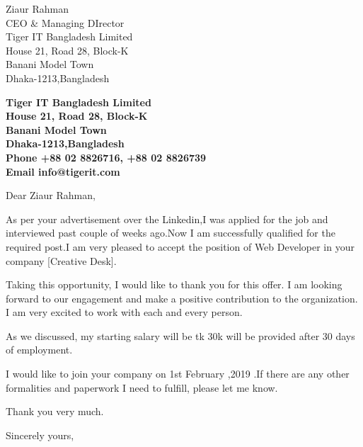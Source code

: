 \documentclass[12pt]{letter}
\begin{document}
\begin{letter}
	{Ziaur Rahman\\
	CEO \& Managing DIrector\\
	Tiger IT Bangladesh Limited\\
	House 21, Road 28, Block-K\\ 
	Banani Model Town\\
	Dhaka-1213,Bangladesh} 
\begin{center}
\large{\bf Tiger IT Bangladesh Limited\\}
\small{\textbf {House 21, Road 28, Block-K\\ 
		Banani Model Town\\
		Dhaka-1213,Bangladesh\\
		Phone +88 02 8826716, +88 02 8826739\\
		Email info@tigerit.com}}
\end{center} 	
						
\signature{.......................................\\(Kanis Fatema)}
		
\opening{Dear Ziaur Rahman,} 
As per your advertisement over the Linkedin,I was applied for the job and interviewed past couple of weeks ago.Now I am successfully qualified for the required post.I am very pleased to accept the position of Web Developer in your company [Creative Desk].
		
Taking this opportunity, I would like to thank you for this offer. I am looking forward to our engagement and make a positive contribution to the organization. I am very excited to work with each and every person.
		
As we discussed, my starting salary will be tk 30k will be provided after 30 days of employment.
		
I would like to join your company on 1st February ,2019 .If there are any other formalities and paperwork I need to fulfill, please let me know.
		
		Thank you very much.
		
		\closing{Sincerely yours,}		
		
	\end{letter} 
\end{document}
